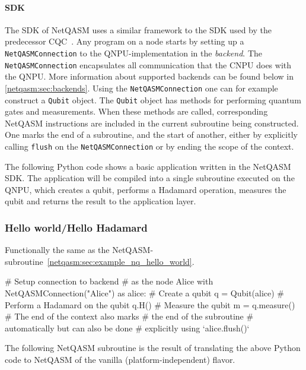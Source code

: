 \paragraph{SDK}
The SDK of \ac{NetQASM} uses a similar framework to the SDK used by the predecessor \ac{CQC}~\cite{git_cqc}.
Any program on a node starts by setting up a \texttt{NetQASMConnection} to the \ac{QNPU}-implementation in the \emph{backend}.
The \texttt{NetQASMConnection} encapsulates all communication that the \ac{CNPU} does with the \ac{QNPU}.
More information about supported backends can be found below in \cref{netqasm:sec:backends}.
Using the \texttt{NetQASMConnection} one can for example construct a \texttt{Qubit} object.
The \texttt{Qubit} object has methods for performing quantum gates and measurements.
When these methods are called, corresponding \ac{NetQASM} instructions are included in the current subroutine being constructed.
One marks the end of a subroutine, and the start of another, either by explicitly calling \texttt{flush} on the \texttt{NetQASMConnection} or by ending the scope of the  context.

The following Python code shows a basic application written in the \ac{NetQASM} SDK.
The application will be compiled into a single subroutine executed on the \ac{QNPU}, which creates a qubit, performs a Hadamard operation, measures the qubit and returns the result to the application layer.
\subsubsection{Hello world/Hello Hadamard}
Functionally the same as the \ac{NetQASM}-subroutine~\ref{netqasm:sec:example_nq_hello_world}.
\begin{pycode}
  # Setup connection to backend
  # as the node Alice
  with NetQASMConnection("Alice") as alice:
    # Create a qubit
    q = Qubit(alice)
    # Perform a Hadamard on the qubit
    q.H()
    # Measure the qubit
    m = q.measure()
    # The end of the context also marks
    # the end of the subroutine
    # automatically but can also be done
    # explicitly using `alice.flush()`
\end{pycode}

The following \ac{NetQASM} subroutine is the result of translating the above Python code to \ac{NetQASM} of the vanilla (platform-independent) flavor.

